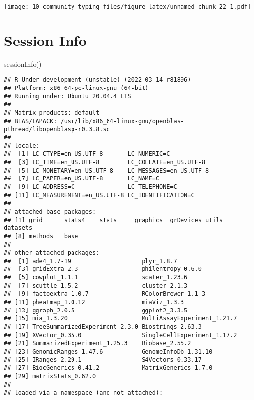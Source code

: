 \documentclass[
  oneside]{book}
\newenvironment{Shaded}{\begin{snugshade}}{\end{snugshade}}
\newcommand{\FunctionTok}[1]{\textcolor[rgb]{0.00,0.00,0.00}{#1}}
\newcommand{\NormalTok}[1]{#1}
\begin{document}
\texttt{[image: 10-community-typing\_files/figure-latex/unnamed-chunk-22-1.pdf]}

\hypertarget{session-info}{%
\section{Session Info}\label{session-info}}

\begin{Shaded}
\begin{Highlighting}[]
\FunctionTok{sessionInfo}\NormalTok{()}
\end{Highlighting}
\end{Shaded}

\begin{verbatim}
## R Under development (unstable) (2022-03-14 r81896)
## Platform: x86_64-pc-linux-gnu (64-bit)
## Running under: Ubuntu 20.04.4 LTS
## 
## Matrix products: default
## BLAS/LAPACK: /usr/lib/x86_64-linux-gnu/openblas-pthread/libopenblasp-r0.3.8.so
## 
## locale:
##  [1] LC_CTYPE=en_US.UTF-8       LC_NUMERIC=C              
##  [3] LC_TIME=en_US.UTF-8        LC_COLLATE=en_US.UTF-8    
##  [5] LC_MONETARY=en_US.UTF-8    LC_MESSAGES=en_US.UTF-8   
##  [7] LC_PAPER=en_US.UTF-8       LC_NAME=C                 
##  [9] LC_ADDRESS=C               LC_TELEPHONE=C            
## [11] LC_MEASUREMENT=en_US.UTF-8 LC_IDENTIFICATION=C       
## 
## attached base packages:
## [1] grid      stats4    stats     graphics  grDevices utils     datasets 
## [8] methods   base     
## 
## other attached packages:
##  [1] ade4_1.7-19                    plyr_1.8.7                    
##  [3] gridExtra_2.3                  philentropy_0.6.0             
##  [5] cowplot_1.1.1                  scater_1.23.6                 
##  [7] scuttle_1.5.2                  cluster_2.1.3                 
##  [9] factoextra_1.0.7               RColorBrewer_1.1-3            
## [11] pheatmap_1.0.12                miaViz_1.3.3                  
## [13] ggraph_2.0.5                   ggplot2_3.3.5                 
## [15] mia_1.3.20                     MultiAssayExperiment_1.21.7   
## [17] TreeSummarizedExperiment_2.3.0 Biostrings_2.63.3             
## [19] XVector_0.35.0                 SingleCellExperiment_1.17.2   
## [21] SummarizedExperiment_1.25.3    Biobase_2.55.2                
## [23] GenomicRanges_1.47.6           GenomeInfoDb_1.31.10          
## [25] IRanges_2.29.1                 S4Vectors_0.33.17             
## [27] BiocGenerics_0.41.2            MatrixGenerics_1.7.0          
## [29] matrixStats_0.62.0            
## 
## loaded via a namespace (and not attached):

\end{verbatim}
\end{document}
